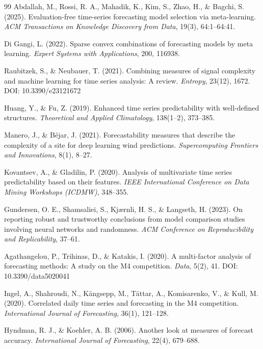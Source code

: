 {\begin{thebibliography}{99}
Abdallah, M., Rossi, R. A., Mahadik, K., Kim, S., Zhao, H., \& Bagchi, S. (2025).
Evaluation-free time-series forecasting model selection via meta-learning.
\emph{ACM Transactions on Knowledge Discovery from Data}, 19(3), 64:1--64:41.

Di Gangi, L. (2022). Sparse convex combinations of forecasting models by meta
learning. \emph{Expert Systems with Applications}, 200, 116938.

Raubitzek, S., \& Neubauer, T. (2021). Combining measures of signal complexity and
machine learning for time series analysis: A review. \emph{Entropy}, 23(12), 1672.
DOI: 10.3390/e23121672

Huang, Y., \& Fu, Z. (2019). Enhanced time series predictability with well-defined
structures. \emph{Theoretical and Applied Climatology}, 138(1--2), 373--385.

Manero, J., \& Béjar, J. (2021). Forecastability measures that describe the
complexity of a site for deep learning wind predictions.
\emph{Supercomputing Frontiers and Innovations}, 8(1), 8--27.

Kovantsev, A., \& Gladilin, P. (2020). Analysis of multivariate time series
predictability based on their features. \emph{IEEE International Conference on Data
Mining Workshops (ICDMW)}, 348--355.

Gundersen, O. E., Shamsaliei, S., Kj\ae{}rnli, H. S., \& Langseth, H. (2023). On reporting robust and
trustworthy conclusions from model comparison studies involving neural networks and
randomness. \emph{ACM Conference on Reproducibility and Replicability}, 37--61.

Agathangelou, P., Trihinas, D., \& Katakis, I. (2020). A multi-factor analysis of
forecasting methods: A study on the M4 competition. \emph{Data}, 5(2), 41.
DOI: 10.3390/data5020041

Ingel, A., Shahroudi, N., Kängsepp, M., Tättar, A., Komisarenko, V., \& Kull, M.
(2020). Correlated daily time series and forecasting in the M4 competition.
\emph{International Journal of Forecasting}, 36(1), 121--128.

Hyndman, R. J., \& Koehler, A. B. (2006).
Another look at measures of forecast accuracy.
\emph{International Journal of Forecasting}, 22(4), 679--688.

\end{thebibliography}
}
